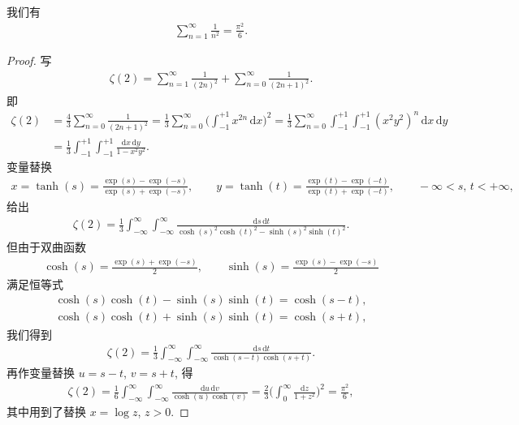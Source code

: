 \begin{theorem}\label{thm:1.2}
我们有
\begin{align*}
  \sum_{n=1}^{\infty}\frac{1}{n^{2}}=\frac{\pi^{2}}{6}.
\end{align*}
\end{theorem}

\begin{proof}
写
\begin{align*}
  \zeta(2)=\sum_{n=1}^{\infty}\frac{1}{(2n)^{2}}+\sum_{n=0}^{\infty}\frac{1}{(2n+1)^{2}}.
\end{align*}
即
\begin{align*}
  \zeta(2)
  &=\frac{4}{3}\sum_{n=0}^{\infty}\frac{1}{(2n+1)^{2}}
   =\frac{1}{3}\sum_{n=0}^{\infty}\Big(\int_{-1}^{+1}x^{2n}\,\mathrm{d}x\Big)^{2}
   =\frac{1}{3}\sum_{n=0}^{\infty}\int_{-1}^{+1}\int_{-1}^{+1}(x^{2}y^{2})^{n}\,\mathrm{d}x\,\mathrm{d}y\\
  &=\frac{1}{3}\int_{-1}^{+1}\int_{-1}^{+1}\frac{\mathrm{d}x\,\mathrm{d}y}{1-x^{2}y^{2}}.
\end{align*}
变量替换
\begin{align*}
  x=\tanh(s)=\frac{\exp(s)-\exp(-s)}{\exp(s)+\exp(-s)}, \qquad
  y=\tanh(t)=\frac{\exp(t)-\exp(-t)}{\exp(t)+\exp(-t)}, \qquad
  -\infty<s,\,t<+\infty,
\end{align*}
给出
\begin{align*}
  \zeta(2)=\frac{1}{3}\int_{-\infty}^{\infty}\int_{-\infty}^{\infty}
  \frac{\mathrm{d}s\,\mathrm{d}t}{\cosh(s)^{2}\cosh(t)^{2}-\sinh(s)^{2}\sinh(t)^{2}}.
\end{align*}
但由于双曲函数
\begin{align*}
  \cosh(s)=\frac{\exp(s)+\exp(-s)}{2}, \qquad
  \sinh(s)=\frac{\exp(s)-\exp(-s)}{2}
\end{align*}
满足恒等式
\begin{align*}
  \cosh(s)\cosh(t)-\sinh(s)\sinh(t)=\cosh(s-t),
\end{align*}
\begin{align*}
  \cosh(s)\cosh(t)+\sinh(s)\sinh(t)=\cosh(s+t),
\end{align*}
我们得到
\begin{align*}
  \zeta(2)=\frac{1}{3}\int_{-\infty}^{\infty}\int_{-\infty}^{\infty}
  \frac{\mathrm{d}s\,\mathrm{d}t}{\cosh(s-t)\cosh(s+t)}.
\end{align*}
再作变量替换 $u = s - t$, $v = s + t$, 得
\begin{align*}
  \zeta(2)=\frac{1}{6}\int_{-\infty}^{\infty}\int_{-\infty}^{\infty}
  \frac{\mathrm{d}u\,\mathrm{d}v}{\cosh(u)\cosh(v)}
  =\frac{2}{3}\Big(\int_{0}^{\infty}\frac{\mathrm{d}z}{1+z^{2}}\Big)^{2}
  =\frac{\pi^{2}}{6},
\end{align*}
其中用到了替换 $x = \log z$, $z > 0$.
\end{proof}

